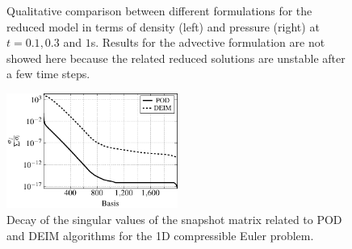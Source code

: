 \begin{figure} [h!]
\begin{centering}
{	}
	\caption{Qualitative comparison between different formulations for the reduced model in terms of density (left) and pressure (right) at $t=0.1,0.3$ and $1$s. Results for the advective formulation are not showed here because the related reduced solutions are unstable after a few time steps.}
	\label{p4.fig:snaps_1D_Euler}
	\end{centering}
\end{figure}

\begin{figure}[h!]
\centering
	\includegraphics[width=0.5\textwidth]{./TikzFigures/thesis-figure21}
\caption{Decay of the singular values of the snapshot matrix related to POD and DEIM algorithms for the 1D compressible Euler problem.}
\label{p4.fig:singular_values_decay_1D}
\end{figure}

